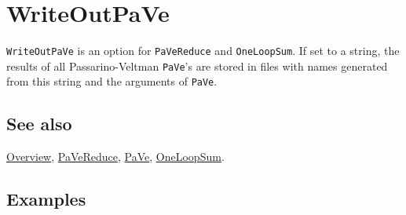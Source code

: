 \documentclass[../FeynCalcManual.tex]{subfiles}
\begin{document}
\hypertarget{writeoutpave}{
\section{WriteOutPaVe}\label{writeoutpave}}

\texttt{WriteOutPaVe} is an option for \texttt{PaVeReduce} and
\texttt{OneLoopSum}. If set to a string, the results of all
Passarino-Veltman \texttt{PaVe}'s are stored in files with names
generated from this string and the arguments of \texttt{PaVe}.

\subsection{See also}

\hyperlink{toc}{Overview}, \hyperlink{pavereduce}{PaVeReduce},
\hyperlink{pave}{PaVe}, \hyperlink{oneloopsum}{OneLoopSum}.

\subsection{Examples}
\end{document}
